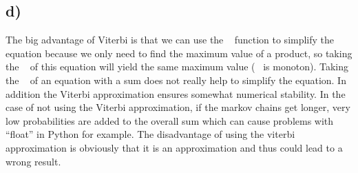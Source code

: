 \subsection*{d)} %
\label{sub:d}
The big advantage of Viterbi is that we can use the \emlog~ function to simplify the equation because we only need to find the maximum value of a product, so taking 
the \emlog~ of this equation will yield the same maximum value (\emlog~ is monoton). Taking the \emlog~ of an equation with a sum does not really help to 
simplify the equation. In addition the Viterbi approximation ensures somewhat numerical stability. In the case of not using the Viterbi approximation, if the markov 
chains get longer, very low probabilities are added to the overall sum which can cause problems with ``float'' in Python for example.
The disadvantage of using the viterbi approximation is obviously that it is an approximation and thus could lead to a wrong result.

